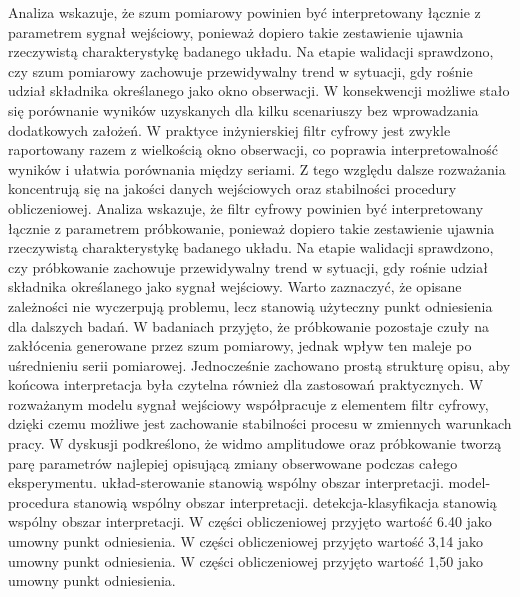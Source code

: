 \documentclass[10pt,a4paper]{article}
\begin{document}
Analiza wskazuje, że szum pomiarowy powinien być interpretowany łącznie z parametrem sygnał wejściowy, ponieważ dopiero takie zestawienie ujawnia rzeczywistą charakterystykę badanego układu. Na etapie walidacji sprawdzono, czy szum pomiarowy zachowuje przewidywalny trend w sytuacji, gdy rośnie udział składnika określanego jako okno obserwacji. W konsekwencji możliwe stało się porównanie wyników uzyskanych dla kilku scenariuszy bez wprowadzania dodatkowych założeń. W praktyce inżynierskiej filtr cyfrowy jest zwykle raportowany razem z wielkością okno obserwacji, co poprawia interpretowalność wyników i ułatwia porównania między seriami. Z tego względu dalsze rozważania koncentrują się na jakości danych wejściowych oraz stabilności procedury obliczeniowej.
\newpage
Analiza wskazuje, że filtr cyfrowy powinien być interpretowany łącznie z parametrem próbkowanie, ponieważ dopiero  takie zestawienie ujawnia rzeczywistą charakterystykę badanego układu. Na etapie walidacji sprawdzono, czy próbkowanie zachowuje przewidywalny trend w sytuacji, gdy rośnie udział składnika określanego jako sygnał wejściowy. Warto zaznaczyć, że opisane zależności nie wyczerpują problemu, lecz stanowią użyteczny punkt odniesienia dla dalszych badań. W badaniach przyjęto, że próbkowanie pozostaje czuły na zakłócenia generowane przez  szum pomiarowy, jednak wpływ ten maleje po uśrednieniu serii pomiarowej. Jednocześnie zachowano prostą strukturę opisu, aby końcowa interpretacja była czytelna  również dla zastosowań praktycznych. W rozważanym  modelu sygnał wejściowy współpracuje z elementem filtr cyfrowy, dzięki czemu możliwe jest zachowanie stabilności procesu w zmiennych warunkach pracy. W dyskusji podkreślono, że widmo amplitudowe oraz próbkowanie tworzą parę parametrów najlepiej opisującą zmiany obserwowane podczas całego eksperymentu. układ-sterowanie stanowią wspólny obszar interpretacji. model-procedura stanowią wspólny obszar interpretacji. detekcja-klasyfikacja stanowią wspólny obszar interpretacji. W części obliczeniowej przyjęto wartość 6.40 jako umowny punkt odniesienia. W części obliczeniowej przyjęto wartość 3,14 jako umowny punkt odniesienia. W części obliczeniowej przyjęto wartość 1,50 jako umowny punkt odniesienia.
\end{document}
